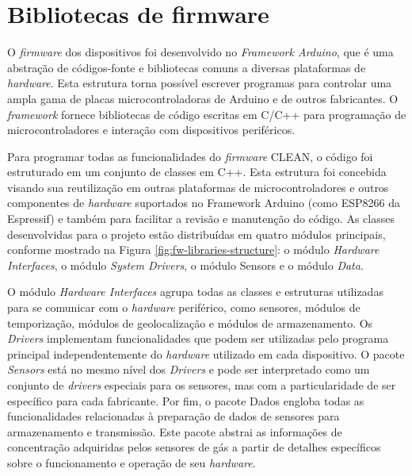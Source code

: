 \section{Bibliotecas de firmware}

O \textit{firmware} dos dispositivos foi desenvolvido no \textit{Framework Arduino}, que é uma abstração de códigos-fonte e bibliotecas comuns a diversas plataformas de \textit{\textit{hardware}}. Esta estrutura torna possível escrever programas para controlar uma ampla gama de placas microcontroladoras de Arduino e de outros fabricantes. O \textit{framework} fornece bibliotecas de código escritas em C/C++ para programação de microcontroladores e interação com dispositivos periféricos.

Para programar todas as funcionalidades do \textit{firmware} CLEAN, o código foi estruturado em um conjunto de classes em C++. Esta estrutura foi concebida visando sua reutilização em outras plataformas de microcontroladores e outros componentes de \textit{hardware} suportados no Framework Arduino (como ESP8266 da Espressif) e também para facilitar a revisão e manutenção do código. As classes desenvolvidas para o projeto estão distribuídas em quatro módulos principais, conforme mostrado na Figura \ref{fig:fw-libraries-structure}: o módulo \textit{Hardware Interfaces}, o módulo \textit{System Drivers}, o módulo \textit{}{Sensors} e o módulo \textit{Data}.

O módulo \textit{Hardware Interfaces} agrupa todas as classes e estruturas utilizadas para se comunicar com o \textit{hardware} periférico, como sensores, módulos de temporização, módulos de geolocalização e módulos de armazenamento. Os \textit{Drivers} implementam funcionalidades que podem ser utilizadas pelo programa principal independentemente do \textit{hardware} utilizado em cada dispositivo. O pacote \textit{Sensors} está no mesmo nível dos \textit{Drivers} e pode ser interpretado como um conjunto de \textit{drivers} especiais para os sensores, mas com a particularidade de ser específico para cada fabricante. Por fim, o pacote Dados engloba todas as funcionalidades relacionadas à preparação de dados de sensores para armazenamento e transmissão. Este pacote abstrai as informações de concentração adquiridas pelos sensores de gás a partir de detalhes específicos sobre o funcionamento e operação de seu \textit{hardware}.

